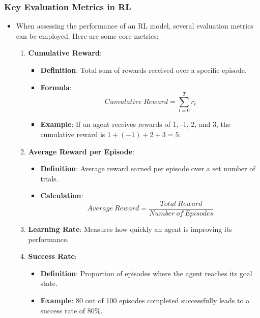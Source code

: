 \documentclass{beamer}
\begin{document}
\begin{frame}[fragile]
    \frametitle{Key Evaluation Metrics in RL}
    \begin{itemize}
        \item When assessing the performance of an RL model, several evaluation metrics can be employed. Here are some core metrics:
        \begin{enumerate}
            \item \textbf{Cumulative Reward}:
            \begin{itemize}
                \item \textbf{Definition}: Total sum of rewards received over a specific episode.
                \item \textbf{Formula}: 
                \begin{equation}
                    Cumulative\ Reward = \sum_{t=0}^{T} r_t
                \end{equation}
                \item \textbf{Example}: If an agent receives rewards of 1, -1, 2, and 3, the cumulative reward is \(1 + (-1) + 2 + 3 = 5\).
            \end{itemize}
            \item \textbf{Average Reward per Episode}:
            \begin{itemize}
                \item \textbf{Definition}: Average reward earned per episode over a set number of trials.
                \item \textbf{Calculation}: 
                \begin{equation}
                    Average\ Reward = \frac{Total\ Reward}{Number\ of\ Episodes}
                \end{equation}
            \end{itemize}
            \item \textbf{Learning Rate}: Measures how quickly an agent is improving its performance.
            \item \textbf{Success Rate}:
            \begin{itemize}
                \item \textbf{Definition}: Proportion of episodes where the agent reaches its goal state.
                \item \textbf{Example}: 80 out of 100 episodes completed successfully leads to a success rate of 80\%.
            \end{itemize}
        \end{enumerate}
    \end{itemize}
\end{frame}
\end{document}
